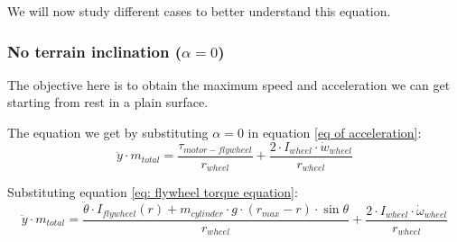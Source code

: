 We will now study different cases to better understand this equation.
\subsubsection{No terrain inclination ($\alpha = 0$)}
The objective here is to obtain the maximum speed and acceleration we can get starting from rest in a plain surface.

The equation we get by substituting $\alpha = 0$ in equation \ref{eq of acceleration}:
\[\ddot{y}\cdot m_{total} = \frac{\tau_{motor-flywheel}}{r_{wheel}} +\frac{2\cdot I_{wheel} \cdot  \dot{w}_{wheel}}{r_{wheel}}\]

Substituting equation \ref{eq: flywheel torque equation}:
\begin{equation}\label{eq: no inclintation}
    \ddot{y}\cdot m_{total} = \frac{\ddot{\theta}\cdot I_{flywheel}(r) +
    m_{cylinder} \cdot  g \cdot  (r_{max} - r) \cdot  \sin{\theta}}{r_{wheel}} +\frac{2\cdot I_{wheel} \cdot  \dot{\omega}_{wheel}}{r_{wheel}}
\end{equation}


